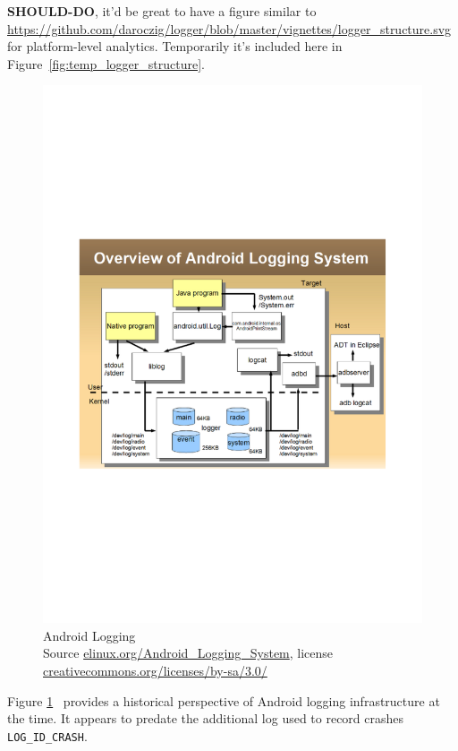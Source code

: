 \textbf{SHOULD-DO}, it'd be great to have a figure similar to \url{https://github.com/daroczig/logger/blob/master/vignettes/logger_structure.svg} for platform-level analytics. Temporarily it's included here in Figure~\ref{fig:temp_logger_structure}.



\begin{figure}
    \includegraphics[width=\linewidth]{images/elinux.org/Android-logging-kmc-kobayashi.pdf}
    \caption[Android Logging]{Android Logging\\Source \href{https://elinux.org/Android_Logging_System}{elinux.org/Android\_Logging\_System}, license \href{https://creativecommons.org/licenses/by-sa/3.0/}{creativecommons.org/licenses/by-sa/3.0/}}
    \label{fig:android_logging_circa_2010}
\end{figure}

Figure \ref{fig:android_logging_circa_2010}~ 
provides a historical perspective of Android logging infrastructure at the time. It appears to predate the additional log used to record crashes \texttt{LOG\_ID\_CRASH}.

